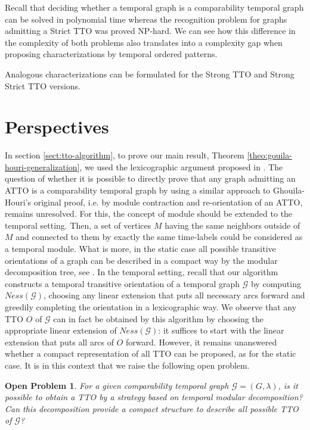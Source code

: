\documentclass[runningheads]{llncs}
\newtheorem{PB}{Open Problem}
\begin{document}
Recall that deciding whether a temporal graph is a comparability temporal graph can be solved in polynomial time whereas the recognition problem for graphs admitting a Strict TTO was proved NP-hard. We can see how this difference in the complexity of both problems also translates into a complexity gap when proposing characterizations by temporal ordered patterns. 

Analogous characterizations can be formulated for the Strong TTO and Strong Strict TTO versions.

\section{Perspectives}
\label{sect:conclusion}

In section \ref{sect:tto-algorithm}, to prove our main result, Theorem \ref{theo:gouila-houri-generalization}, we used the lexicographic argument proposed in \cite{hell1995lexicographic}. The question of whether it is possible to directly prove that any graph admitting an ATTO is a comparability temporal graph by using a similar approach to Ghouila-Houri's original proof, i.e. by module contraction and re-orientation of an ATTO, remains unresolved. For this, the concept of module should be extended to the temporal setting. Then, a set of vertices $M$ having the same neighbors outside of $M$ and connected to them by exactly the same time-labels could be considered as a temporal module. What is more, in the static case all possible transitive orientations of a graph can be described in a compact way by the modular decomposition tree, see \cite{Golumbic2nd}. In the temporal setting, recall that our algorithm  constructs a temporal transitive orientation of a temporal graph $\mathcal{G}$ by computing $Ness(\mathcal{G})$, choosing any linear extension that puts all necessary arcs forward and greedily completing the orientation in a lexicographic way. We observe that any TTO $O$ of $\mathcal{G}$ can in fact be obtained by this algorithm by choosing the appropriate linear extension of $Ness(\mathcal{G})$: it suffices to start with the linear extension that puts all arcs of $O$ forward. However, it remains unanswered whether a compact representation of all TTO can be proposed, as for the static case. It is in this context that we raise the following open problem.

\begin{PB}
\label{op:tto-temporal-modular-decomposition}
For a given comparability temporal graph $\mathcal{G}=(G,\lambda)$, is it possible to obtain a TTO by a strategy based on temporal modular decomposition? Can this decomposition provide a compact structure to describe all possible TTO of $\mathcal{G}$?
\end{PB}
\end{document}
